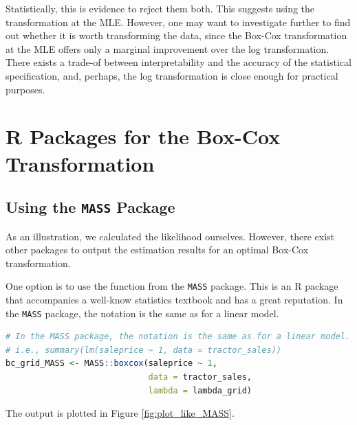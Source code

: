 Statistically, this is evidence to reject them both.
This suggests using the transformation at the MLE.
However, one may want to investigate further 
to find out whether it is worth 
transforming the data, 
since the Box-Cox transformation at the MLE offers only a marginal improvement over the log transformation. 
There exists a trade-of between interpretability and 
the accuracy of the statistical specification, 
and, perhaps, the log transformation is close enough 
for practical purposes. 


\clearpage
\section{\textsf{R} Packages for the Box-Cox Transformation}
\subsection*{Using the \texttt{MASS} Package}

As an illustration, we calculated
the likelihood ourselves.
However, there exist other packages
to output the estimation results for
an optimal Box-Cox transformation.

One option is to use the function from the \texttt{MASS} package.
This is an \textsf{R} package that accompanies a well-know statistics textbook
and has a great reputation. 
In the \texttt{MASS} package, the notation is the same as for a linear model.


\begin{lstlisting}[language=R]
# In the MASS package, the notation is the same as for a linear model.
# i.e., summary(lm(saleprice ~ 1, data = tractor_sales))
bc_grid_MASS <- MASS::boxcox(saleprice ~ 1,
                             data = tractor_sales,
                             lambda = lambda_grid)
\end{lstlisting}

The output is plotted in Figure \ref{fig:plot_like_MASS}.

